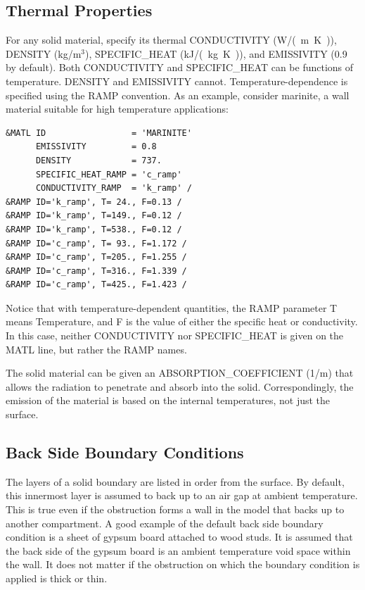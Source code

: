 \documentclass[11pt]{book}
\begin{document}
\subsection{Thermal Properties}

\label{info:thermal_properties}

For any solid material, specify its thermal
{\ct CONDUCTIVITY} (\si{W/(m.K)}), {\ct DENSITY} (kg/m$^3$),
{\ct SPECIFIC\_HEAT} (\si{kJ/(kg.K)}), and {\ct EMISSIVITY} (0.9 by default).
Both {\ct CONDUCTIVITY} and {\ct SPECIFIC\_HEAT} can be functions of
temperature. {\ct DENSITY} and {\ct EMISSIVITY} cannot.
Temperature-dependence is specified using the {\ct RAMP} convention.
As an example, consider marinite, a wall material suitable for high temperature applications:

\begin{lstlisting}
&MATL ID                 = 'MARINITE'
      EMISSIVITY         = 0.8
      DENSITY            = 737.
      SPECIFIC_HEAT_RAMP = 'c_ramp'
      CONDUCTIVITY_RAMP  = 'k_ramp' /
&RAMP ID='k_ramp', T= 24., F=0.13 /
&RAMP ID='k_ramp', T=149., F=0.12 /
&RAMP ID='k_ramp', T=538., F=0.12 /
&RAMP ID='c_ramp', T= 93., F=1.172 /
&RAMP ID='c_ramp', T=205., F=1.255 /
&RAMP ID='c_ramp', T=316., F=1.339 /
&RAMP ID='c_ramp', T=425., F=1.423 /
\end{lstlisting}
Notice that with temperature-dependent quantities, the {\ct RAMP} parameter
{\ct T} means Temperature, and {\ct F} is the value of either
the specific heat or conductivity. In this case, neither {\ct CONDUCTIVITY} nor {\ct SPECIFIC\_HEAT} is given on the
{\ct MATL} line, but rather the {\ct RAMP} names.

The solid
material can be given an {\ct ABSORPTION\_COEFFICIENT} (1/m) that allows
the radiation to penetrate and absorb into the solid. Correspondingly,
the emission of the material is based on the internal temperatures,
not just the surface.




\subsection{Back Side Boundary Conditions}
\label{info:BACKING}

The layers of a solid boundary are listed in order from the surface. By default,
this innermost layer is assumed to back up to an air gap at ambient
temperature. This is true even if the obstruction forms a wall in the model that backs up to another
compartment. A good example of the default back side boundary condition is a sheet of gypsum board attached to wood studs.
It is assumed that the back side of the gypsum board is an ambient temperature void space within the wall. It does not
matter if the obstruction on which the boundary condition is applied is thick or thin.
\end{document}
